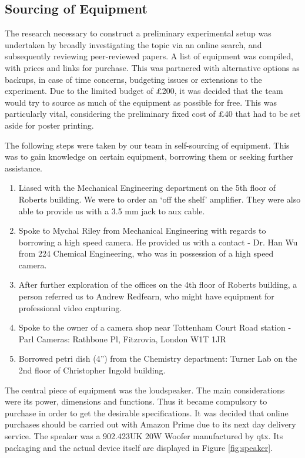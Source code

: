 \subsection{Sourcing of Equipment}

The research necessary to construct a preliminary experimental setup was undertaken by broadly investigating the topic via an online search, and subsequently reviewing peer-reviewed papers. A list of equipment was compiled, with prices and links for purchase. This was partnered with alternative options as backups, in case of time concerns, budgeting issues or extensions to the experiment. Due to the limited budget of £200, it was decided that the team would try to source as much of the equipment as possible for free. This was particularly vital, considering the preliminary fixed cost of £40 that had to be set aside for poster printing.

The following steps were taken by our team in self-sourcing of equipment. This was to gain knowledge on certain equipment, borrowing them or seeking further assistance.

\begin{enumerate}
\item  Liased with the Mechanical Engineering department on the 5th floor of  Roberts building. We were to order an `off the shelf' amplifier.  They were also able to provide us with a 3.5 mm jack to aux cable.
\item  Spoke to Mychal Riley from Mechanical Engineering with regards to  borrowing a  high  speed camera. He provided us with a contact - Dr. Han Wu from 224  Chemical Engineering, who was in possession of a high speed camera.
\item  After further exploration of the offices on the 4th floor of Roberts  building, a person referred us to Andrew Redfearn, who might have  equipment for professional video capturing.
\item  Spoke to the owner of a camera shop near Tottenham Court Road station  - Parl Cameras: Rathbone Pl, Fitzrovia, London W1T 1JR
\item  Borrowed petri dish (4'') from the Chemistry department: Turner Lab  on the 2nd floor of Christopher Ingold building.
\end{enumerate}

The central piece of equipment was the loudspeaker. The main considerations were its power, dimensions and functions. Thus it became compulsory to purchase in order to get the desirable specifications. It was decided that online purchases should be carried out with Amazon Prime due to its next day delivery service. The speaker was a 902.423UK 20W Woofer manufactured by qtx. Its packaging and the actual device itself are displayed in Figure \ref{fig:speaker}.

